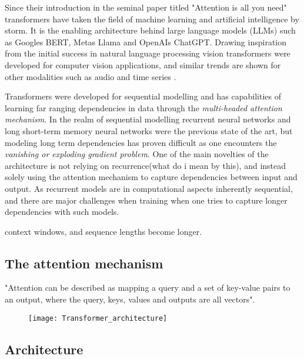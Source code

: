 \documentclass[../../thesis.tex]{subfiles}
\begin{document}
Since their introduction in the seminal paper titled "Attention is all you need"\cite{vaswani2023attention} transformers have taken the field of machine learning and artificial intelligence by storm. It is the enabling architecture behind large language models (LLMs) such as Googles BERT, Metas Llama and OpenAIs ChatGPT. Drawing inspiration from the initial success in natural language processing vision transformers \cite{dosovitskiy2021image} were developed for computer vision applications, and similar trends are shown for other modalities such as audio \cite{latif2023transformers} and time series \cite{wen2023transformers}. \newline

Transformers were developed for sequential modelling and has capabilities of learning far ranging dependencies in data through the \textit{multi-headed attention mechanism}. In the realm of sequential modelling recurrent neural networks  and long short-term memory neural networks were the previous state of the art, but modeling long term dependencies has proven difficult \cite{279181} as one encounters the \textit{vanishing or exploding gradient problem}. One of the main novelties of the architecture is not relying on recurrence(what do i mean by this), and instead solely using the attention mechanism to capture dependencies between input and output. As recurrent models are in computational aspects inherently sequential, and there are major challenges when training when one tries to capture longer dependencies with such models.


context windows, and sequence lengths become longer. 








\subsection{The attention mechanism}
"Attention can be described as mapping a query and a set of key-value pairs to an output, where the query, keys, values and outputs are all vectors". 


\begin{figure}[h]
    \texttt{[image: Transformer\_architecture]}
    \centering    
\end{figure}

\subsection{Architecture}
\end{document}
